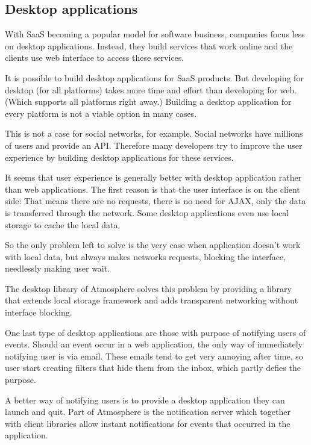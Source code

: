 \subsection{Desktop applications}

With SaaS becoming a popular model for software business, companies focus less on desktop applications. Instead, they build services that work online and the clients use web interface to access these services.

It is possible to build desktop applications for SaaS products. But developing for desktop (for all platforms) takes more time and effort than developing for web. (Which supports all platforms right away.) Building a desktop application for every platform is not a viable option in many cases.

This is not a case for social networks, for example. Social networks have millions of users and provide an API. Therefore many developers try to improve the user experience by building desktop applications for these services.

It seems that user experience is generally better with desktop application rather than web applications. The first reason is that the user interface is on the client side: That means there are no requests, there is no need for AJAX, only the data is transferred through the network. Some desktop applications even use local storage to cache the local data.

So the only problem left to solve is the very case when application doesn’t work with local data, but always makes networks requests, blocking the interface, needlessly making user wait. 

The desktop library of Atmosphere solves this problem by providing a library that extends local storage framework and adds transparent networking without interface blocking. 

One last type of desktop applications are those with purpose of notifying users of events. Should an event occur in a web application, the only way of immediately notifying user is via email. These emails tend to get very annoying after time, so user start creating filters that hide them from the inbox, which partly defies the purpose.

A better way of notifying users is to provide a desktop application they can launch and quit. Part of Atmosphere is the notification server which together with client libraries allow instant notifications for events that occurred in the application. 

